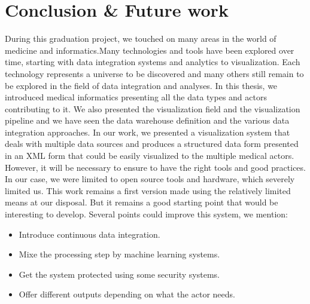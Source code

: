 \chapter{Conclusion \& Future work}
During this graduation project, we touched on many areas in the world of medicine and informatics.Many technologies and tools have been explored over time, starting with data integration systems and analytics to visualization. Each technology represents a universe to be discovered and many others still remain to be explored in the field of data integration and analyses.
\bigbreak
In this thesis, we introduced medical informatics presenting all the data types and actors contributing to it. We also presented the visualization field and the visualization pipeline and we have seen the data warehouse definition and the various data integration approaches.
In our work, we presented a visualization system that deals with multiple data sources and produces a structured data form presented in an XML form that could be easily visualized to the multiple medical actors. However, it will be necessary to ensure to have the right tools and good practices. In our case, we were limited to open source tools and hardware, which severely limited us.
\bigbreak
This work remains a first version made using the relatively limited means at our disposal. But it remains a good starting point that would be interesting to develop. Several points could improve this system, we mention:
\begin{itemize}
\item Introduce continuous data integration.
\item Mixe the processing step by machine learning systems.
\item Get the system protected using some security systems.
\item Offer different outputs depending on what the actor needs.
\end{itemize}
